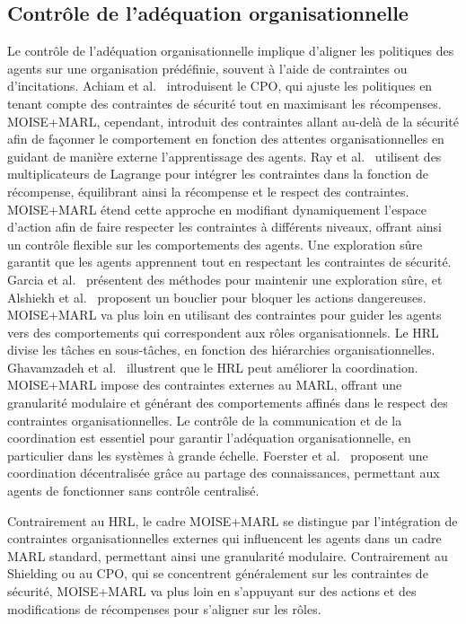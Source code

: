 \subsection{Contrôle de l'adéquation organisationnelle}
Le contrôle de l'adéquation organisationnelle implique d'aligner les politiques des agents sur une organisation prédéfinie, souvent à l'aide de contraintes ou d'incitations.
%
Achiam et al.~\cite{achiam2017cpo} introduisent le CPO, qui ajuste les politiques en tenant compte des contraintes de sécurité tout en maximisant les récompenses. MOISE+MARL, cependant, introduit des contraintes allant au-delà de la sécurité afin de façonner le comportement en fonction des attentes organisationnelles en guidant de manière externe l'apprentissage des agents.
%
Ray et al.~\cite{ray2019benchmarking} utilisent des multiplicateurs de Lagrange pour intégrer les contraintes dans la fonction de récompense, équilibrant ainsi la récompense et le respect des contraintes. MOISE+MARL étend cette approche en modifiant dynamiquement l'espace d'action afin de faire respecter les contraintes à différents niveaux, offrant ainsi un contrôle flexible sur les comportements des agents.
%
Une exploration sûre garantit que les agents apprennent tout en respectant les contraintes de sécurité. Garcia et al.~\cite{garcia2015comprehensive} présentent des méthodes pour maintenir une exploration sûre, et Alshiekh et al.~\cite{alshiekh2018safe} proposent un bouclier pour bloquer les actions dangereuses. MOISE+MARL va plus loin en utilisant des contraintes pour guider les agents vers des comportements qui correspondent aux rôles organisationnels.
%
Le HRL divise les tâches en sous-tâches, en fonction des hiérarchies organisationnelles. Ghavamzadeh et al.~\cite{ghavamzadeh2006hrl} illustrent que le HRL peut améliorer la coordination. MOISE+MARL impose des contraintes externes au MARL, offrant une granularité modulaire et générant des comportements affinés dans le respect des contraintes organisationnelles.
%
Le contrôle de la communication et de la coordination est essentiel pour garantir l'adéquation organisationnelle, en particulier dans les systèmes à grande échelle. Foerster et al.~\cite{foerster2018communication} proposent une coordination décentralisée grâce au partage des connaissances, permettant aux agents de fonctionner sans contrôle centralisé.

Contrairement au HRL, le cadre MOISE+MARL se distingue par l'intégration de contraintes organisationnelles externes qui influencent les agents dans un cadre MARL standard, permettant ainsi une granularité modulaire. Contrairement au Shielding ou au CPO, qui se concentrent généralement sur les contraintes de sécurité, MOISE+MARL va plus loin en s'appuyant sur des actions et des modifications de récompenses pour s'aligner sur les rôles. %


